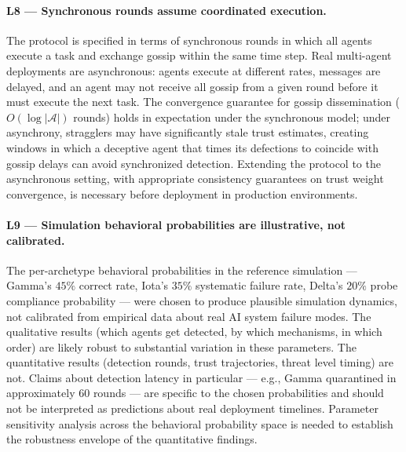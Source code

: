 \paragraph{L8 — Synchronous rounds assume coordinated execution.}
The protocol is specified in terms of synchronous rounds in which all agents execute a
task and exchange gossip within the same time step.  Real multi-agent deployments are
asynchronous: agents execute at different rates, messages are delayed, and an agent may
not receive all gossip from a given round before it must execute the next task.  The
convergence guarantee for gossip dissemination ($O(\log |\mathcal{A}|)$ rounds) holds
in expectation under the synchronous model; under asynchrony, stragglers may have
significantly stale trust estimates, creating windows in which a deceptive agent that
times its defections to coincide with gossip delays can avoid synchronized detection.
Extending the protocol to the asynchronous setting, with appropriate consistency
guarantees on trust weight convergence, is necessary before deployment in production
environments.

\paragraph{L9 — Simulation behavioral probabilities are illustrative, not calibrated.}
The per-archetype behavioral probabilities in the reference simulation — Gamma's $45\%$
correct rate, Iota's $35\%$ systematic failure rate, Delta's $20\%$ probe compliance
probability — were chosen to produce plausible simulation dynamics, not calibrated from
empirical data about real AI system failure modes.  The qualitative results (which agents
get detected, by which mechanisms, in which order) are likely robust to substantial
variation in these parameters.  The quantitative results (detection rounds, trust
trajectories, threat level timing) are not.  Claims about detection latency in particular
— e.g., Gamma quarantined in approximately $60$ rounds — are specific to the chosen
probabilities and should not be interpreted as predictions about real deployment timelines.
Parameter sensitivity analysis across the behavioral probability space is needed to
establish the robustness envelope of the quantitative findings.

